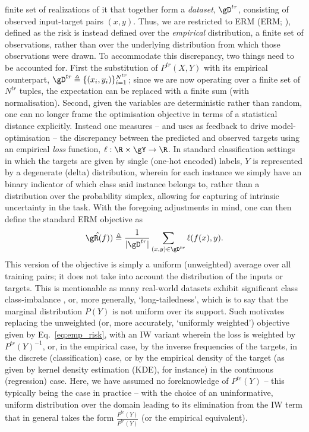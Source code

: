 finite set of realizations of it that together form a \emph{dataset}, \( \gD^{tr} \), consisting of
observed input-target pairs \( (x, y) \). 
%
Thus, we are restricted to \acl{ERM} (\acs{ERM}; \citealp{vapnik1991principles}), defined as the risk
is instead defined over the \emph{empirical} distribution, a finite set of observations, rather
than over the underlying distribution from which those observations were drawn.
%
%
To accommodate this discrepancy, two things need to be accounted for. 
%
First the substitution of \( P^{tr}(X, Y) \) with its empirical counterpart, \( \gD^{tr} \triangleq
\{(x_i, y_i) \}_{i=1}^{N^{tr}} \); since we are now operating over a finite set of \( N^{tr} \)
tuples, the expectation can be replaced with a finite sum (with normalisation). 
%
Second, given the variables are deterministic rather than random, one can no longer frame the
optimisation objective in terms of a statistical distance explicitly. 
%
Instead one measures -- and uses as feedback to drive model-optimisation -- the discrepancy between
the predicted and observed targets using an empirical \emph{loss} function, \( \ell: \R \times \gY
\to \R \). 
%
In standard classification settings in which the targets are given by single (one-hot encoded)
labels, \( Y \) is represented by a degenerate (delta) distribution, wherein for each instance we
simply have an binary indicator of which class said instance belongs to, rather than a distribution
over the probability simplex, allowing for capturing of intrinsic uncertainty in the task.
%
With the foregoing adjustments in mind, one can then define the standard \ac{ERM} objective as
\begin{equation*}\label{eq:emp_risk} 
    \hat{\gR(f)}) \triangleq \frac{1}{|\gD^{tr}|}  \sum_{(x, y) \in \gD^{tr}} \ell (f(x), y). 
%
\end{equation*}
%
This version of the objective is simply a uniform (unweighted) average over all training pairs; it
does not take into account the distribution of the inputs or targets.
%
%
This is mentionable as many real-world datasets exhibit significant class class-imbalance
\citep{zhu2014capturing, van2017devil}, or, more generally, `long-tailedness', which is to say that
the marginal distribution \( P(Y) \) is not uniform over its support.
Such motivates replacing the unweighted (or, more accurately, `uniformly weighted') objective given
by Eq.~\ref{eq:emp_risk}, with an \ac{IW} variant wherein the loss is weighted
by \( P^{tr}(Y)^{-1} \), or, in the empirical case, by the inverse frequencies of the targets, in
the discrete (classification) case, or by the empirical density of the target (as given by kernel
density estimation (KDE), for instance) in the continuous (regression) case.
Here, we have assumed no foreknowledge of \( P^{te}(Y) \) -- this typically being the case in
practice -- with the choice of an uninformative, uniform distribution over the domain leading to
its elimination from the \ac{IW} term that in general takes the form \( \frac{ P^{te}(Y) }{
P^{tr}(Y) } \) (or the empirical equivalent).

